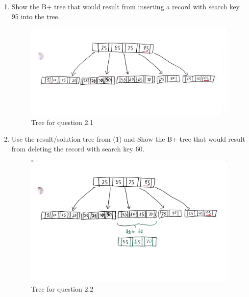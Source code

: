 \documentclass[11pt]{article}
\begin{document}

\begin{enumerate}
	\item Show the B+ tree that would result from inserting a record with search key 95 into the tree.\\

	\begin{figure}[H]
		\centering
		\includegraphics[width=0.9\columnwidth]{figure_q2_1.png}
		\caption{Tree for question 2.1}
		\label{figure:q2.1}
	\end{figure}

	\item Use the result/solution tree from (1) and Show the B+ tree that would result from deleting the record with search key 60.\\

	\begin{figure}[H]
		\centering
		\includegraphics[width=0.9\columnwidth]{figure_q2_2.png}
		\caption{Tree for question 2.2}
		\label{figure:q2.2}
	\end{figure}


\end{enumerate}
\end{document}
